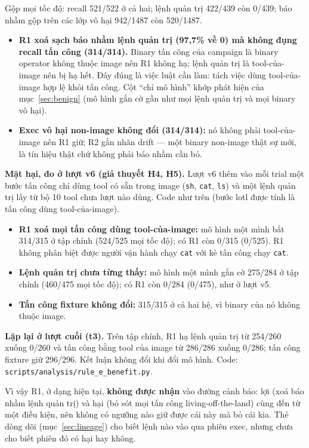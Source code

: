 Gộp mọi tốc độ: recall 521/522 ở cả hai; lệnh quản trị 422/439 còn 0/439; báo nhầm gộp trên các lớp vô hại 942/1487 còn 520/1487.

\begin{itemize}
\tightlist
\item
  \textbf{R1 xoá sạch báo nhầm lệnh quản trị (97,7\% về 0) mà không đụng recall tấn công (314/314).} Binary tấn công của campaign là binary operator không thuộc image nên R1 không hạ; lệnh quản trị là tool-của-image nên bị hạ hết. Đây đúng là việc luật cần làm: tách việc dùng tool-của-image hợp lệ khỏi tấn công. Cột ``chỉ mô hình'' khớp phát hiện của mục~\ref{sec:benign} (mô hình gắn cờ gần như mọi lệnh quản trị và mọi binary vô hại).
\item
  \textbf{Exec vô hại non-image không đổi (314/314):} nó không phải tool-của-image nên R1 giữ; R2 gắn nhãn drift --- một binary non-image thật sự mới, là tín hiệu thật chứ không phải báo nhầm cần bỏ.
\end{itemize}

\textbf{Mặt hại, đo ở lượt v6 (giả thuyết H4, H5).} Lượt v6 thêm vào mỗi trial một bước tấn công chỉ dùng tool có sẵn trong image (\texttt{sh}, \texttt{cat}, \texttt{ls}) và một lệnh quản trị lấy từ bộ 10 tool chưa lượt nào dùng. Code như trên (bước lotl được tính là tấn công dùng tool-của-image).

\begin{itemize}
\tightlist
\item
  \textbf{R1 xoá mọi tấn công dùng tool-của-image:} mô hình một mình bắt 314/315 ở tập chính (524/525 mọi tốc độ); có R1 còn 0/315 (0/525). R1 không phân biệt được người vận hành chạy \texttt{cat} với kẻ tấn công chạy \texttt{cat}.
\item
  \textbf{Lệnh quản trị chưa từng thấy:} mô hình một mình gắn cờ 275/284 ở tập chính (460/475 mọi tốc độ); có R1 còn 0/284 (0/475), như ở lượt v5.
\item
  \textbf{Tấn công fixture không đổi:} 315/315 ở cả hai hệ, vì binary của nó không thuộc image.
\end{itemize}

\textbf{Lặp lại ở lượt cuối (t3).} Trên tập chính, R1 hạ lệnh quản trị từ 254/260 xuống 0/260 và tấn công bằng tool của image từ 286/286 xuống 0/286; tấn công fixture giữ 296/296. Kết luận không đổi khi đổi mô hình. Code: \texttt{scripts/\allowbreak{}analysis/\allowbreak{}rule\_\allowbreak{}e\_\allowbreak{}benefit.py}.

Vì vậy R1, ở dạng hiện tại, \textbf{không được nhận} vào đường cảnh báo: lợi (xoá báo nhầm lệnh quản trị) và hại (bỏ sót mọi tấn công living-off-the-land) cùng đến từ một điều kiện, nên không có ngưỡng nào giữ được cái này mà bỏ cái kia. Thẻ dòng dõi (mục~\ref{sec:lineage}) cho biết lệnh nào vào qua phiên exec, nhưng chưa cho biết phiên đó có hại hay không.

